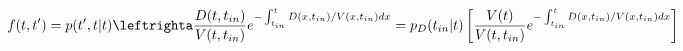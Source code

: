 \begin{equation}
f(t,t') = p(t',t|t) \leftrighta \frac{D(t,t_{in})}{V(t,t_{in})}e^{-\int_{t_{in}}^t D(x,t_{in})/V(x,t_{in}) dx} = p_D(t_{in}|t)\left[ \frac{V(t)}{V(t,t_{in})} e^{-\int_{t_{in}}^t D(x,t_{in})/V(x,t_{in}) dx}\right]
\end{equation}